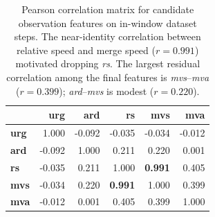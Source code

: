 \begin{table}[htbp]
\centering
\caption{Pearson correlation matrix for candidate observation features on
  in-window dataset steps. The near-identity correlation between relative
  speed and merge speed ($r{=}0.991$) motivated dropping \emph{rs}. The
  largest residual correlation among the final features is \emph{mvs}--\emph{mva}
  ($r{=}0.399$); \emph{ard}--\emph{mvs} is modest ($r{=}0.220$).}
\label{tab:feature_corr}
\small
\begin{tabular}{lrrrrr}
\toprule
 & \textbf{urg} & \textbf{ard} & \textbf{rs} & \textbf{mvs} & \textbf{mva} \\
\midrule
\textbf{urg} & 1.000 & -0.092 & -0.035 & -0.034 & -0.012 \\
\textbf{ard} & -0.092 & 1.000 & 0.211 & 0.220 & 0.001 \\
\textbf{rs} & -0.035 & 0.211 & 1.000 & \textbf{0.991} & 0.405 \\
\textbf{mvs} & -0.034 & 0.220 & \textbf{0.991} & 1.000 & 0.399 \\
\textbf{mva} & -0.012 & 0.001 & 0.405 & 0.399 & 1.000 \\
\bottomrule
\end{tabular}
\end{table}
